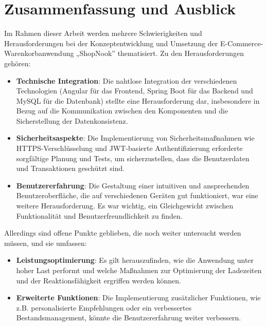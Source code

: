 \chapter{Zusammenfassung und Ausblick}

Im Rahmen dieser Arbeit werden mehrere Schwierigkeiten und Herausforderungen bei der Konzeptentwicklung und Umsetzung der E-Commerce-Warenkorbanwendung „ShopNook'' thematisiert. Zu den Herausforderungen gehören:

\begin{itemize}
	\item \textbf{Technische Integration}: Die nahtlose Integration der verschiedenen Technologien (Angular für das Frontend, Spring Boot für das Backend und MySQL für die Datenbank) stellte eine Herausforderung dar, insbesondere in Bezug auf die Kommunikation zwischen den Komponenten und die Sicherstellung der Datenkonsistenz.
	\item \textbf{Sicherheitsaspekte}: Die Implementierung von Sicherheitsmaßnahmen wie HTTPS-Verschlüsselung und JWT-basierte Authentifizierung erforderte sorgfältige Planung und Tests, um sicherzustellen, dass die Benutzerdaten und Transaktionen geschützt sind.
	\item \textbf{Benutzererfahrung}: Die Gestaltung einer intuitiven und ansprechenden Benutzeroberfläche, die auf verschiedenen Geräten gut funktioniert, war eine weitere Herausforderung. Es war wichtig, ein Gleichgewicht zwischen Funktionalität und Benutzerfreundlichkeit zu finden.
\end{itemize}

Allerdings sind offene Punkte geblieben, die noch weiter untersucht werden müssen, und sie umfassen:

\begin{itemize}
	\item \textbf{Leistungsoptimierung}: Es gilt herauszufinden, wie die Anwendung unter hoher Last performt und welche Maßnahmen zur Optimierung der Ladezeiten und der Reaktionsfähigkeit ergriffen werden können.
	\item \textbf{Erweiterte Funktionen}: Die Implementierung zusätzlicher Funktionen, wie z.B. personalisierte Empfehlungen oder ein verbessertes Bestandsmanagement, könnte die Benutzererfahrung weiter verbessern.
\end{itemize}
